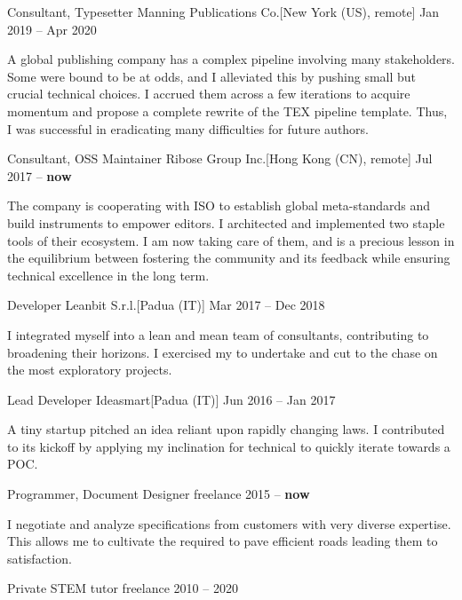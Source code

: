 \documentclass[
  fontsize=9pt,
  DIV=calc,
  parskip=half,
]{scrartcl}
\def\Phi{1.618}
\newlength{\Pad}\setlength{\Pad}{14.562pt} %
\begin{document}
\Event
  {Consultant, Typesetter}
  {Manning Publications Co.}[New York (US), remote]
  {Jan 2019 -- Apr 2020}

A global publishing company has a complex pipeline involving many stakeholders.
Some were bound to be at odds, and I alleviated this by pushing small but
crucial technical choices.
%
I  accrued them across a few iterations
to acquire momentum and propose a complete rewrite of the TEX pipeline template.
Thus, I was successful in eradicating many difficulties for future authors.

\smallskip

\Event
  {Consultant, OSS Maintainer}
  {Ribose Group Inc.}[Hong Kong (CN), remote]
  {Jul 2017 -- \textbf{now}}

The company is cooperating with ISO to establish global meta-standards and build
instruments to empower editors. I architected and implemented two staple
 tools of their ecosystem.
%
I am now taking care of them, and  is a precious lesson in
the equilibrium between fostering the community and its feedback while ensuring
technical excellence in the long term.

\smallskip

\Event
  {Developer}
  {Leanbit S.r.l.}[Padua (IT)]
  {Mar 2017 -- Dec 2018}

I integrated myself into a lean and mean team of consultants, contributing to
broadening their horizons. I exercised my  to undertake and
cut to the chase on the most exploratory projects.

\smallskip

\Event
  {Lead Developer}
  {Ideasmart}[Padua (IT)]
  {Jun 2016 -- Jan 2017}

A tiny startup pitched an idea reliant upon rapidly changing laws.
I contributed to its kickoff by applying my inclination for technical 
to quickly iterate towards a POC.

\smallskip

\Event
  {Programmer, Document Designer}
  {freelance}
  {2015 -- \textbf{now}}

I negotiate and analyze specifications from customers with very diverse
expertise. This allows me to cultivate the  required
to pave efficient roads leading them to satisfaction.

\smallskip

\Event
  {Private STEM tutor}
  {freelance}
  {2010 -- 2020}
\end{document}
